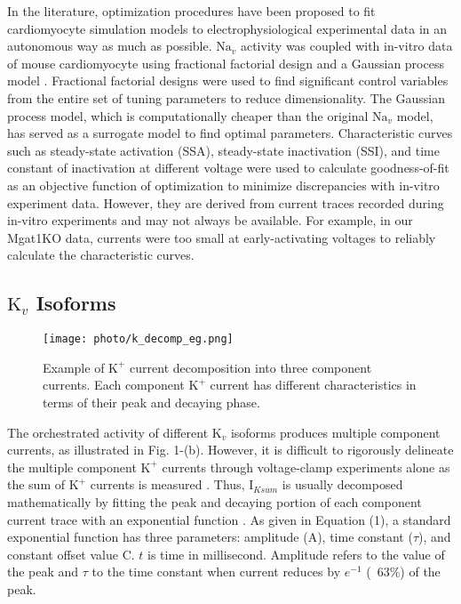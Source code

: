 \documentclass[journal]{IEEEtran}
\begin{document}
In the literature, optimization procedures have been proposed to fit cardiomyocyte simulation models to electrophysiological experimental data in an autonomous way as much as possible. $\text{Na}_{v}$ activity was coupled with in-vitro data of mouse cardiomyocyte using fractional factorial design and a Gaussian process model \cite{du2015statistical}. Fractional factorial designs were used to find significant control variables from the entire set of tuning parameters to reduce dimensionality. The Gaussian process model, which is computationally cheaper than the original $\text{Na}_{v}$ model, has served as a surrogate model to find optimal parameters. Characteristic curves such as steady-state activation (SSA), steady-state inactivation (SSI), and time constant of inactivation at different voltage were used to calculate goodness-of-fit as an objective function of optimization to minimize discrepancies with in-vitro experiment data. However, they are derived from current traces recorded during in-vitro experiments and may not always be available. For example, in our Mgat1KO data, currents were too small at early-activating voltages to reliably calculate the characteristic curves.  

\subsection{$\text{K}_{v}$ Isoforms}
\begin{figure}
    \label{fig3}
    \centering
    \texttt{[image: photo/k\_decomp\_eg.png]}
    \caption{Example of $\text{K}^{+}$ current decomposition into three component currents. Each component $\text{K}^{+}$ current has different characteristics in terms of their peak and decaying phase.}
\end{figure}
The orchestrated activity of different $\text{K}_{v}$ isoforms produces multiple component currents, as illustrated in Fig. 1-(b). However, it is difficult to rigorously delineate the multiple component $\text{K}^{+}$ currents through voltage-clamp experiments alone as the sum of $\text{K}^{+}$ currents is measured \cite{brouillette2004functional}. Thus, $\text{I}_{Ksum}$ is usually decomposed mathematically by fitting the peak and decaying portion of each component current trace with an exponential function \cite{brunet2004heterogeneous}. As given in Equation (1), a standard exponential function has three parameters: amplitude ($\text{A}$), time constant ($\tau$), and constant offset value $\text{C}$. $t$ is time in millisecond. Amplitude refers to the value of the peak and $\tau$ to the time constant when current reduces by $e^{-1}$ (~63\%) of the peak. 
\end{document}
